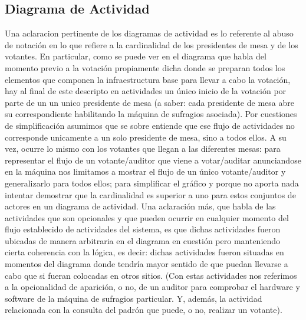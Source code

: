 \documentclass[spanish, 10pt,a4paper]{article}
\numberwithin{equation}{section} %
\begin{document}
\subsection{Diagrama de Actividad}
Una aclaracion pertinente de los diagramas de actividad es lo referente al abuso de notación en lo que refiere a la cardinalidad de los presidentes de mesa y de los votantes. En particular, como se puede ver en el diagrama que habla del momento previo a la votaci\'on propiamente dicha donde se preparan todos los elementos que componen la infraestructura base para llevar a cabo la votaci\'on, hay al final de este descripto en actividades un \'unico inicio de la votaci\'on por parte de un un unico presidente de mesa (a saber: cada presidente de mesa abre su correspondiente habilitando la m\'aquina de sufragios asociada). Por cuestiones de simplificaci\'on asumimos que se sobre entiende que ese flujo de actividades no corresponde unicamente a un solo presidente de mesa, sino a todos ellos.
A su vez, ocurre lo mismo con los votantes que llegan a las diferentes mesas: para representar el flujo de un votante/auditor que viene a votar/auditar anunciandose en la m\'aquina nos limitamos a mostrar el flujo de un \'unico votante/auditor y generalizarlo para todos ellos; para simplificar el gr\'afico y porque no aporta nada intentar demostrar que la cardinalidad es superior a uno para estos conjuntos de actores en un diagrama de actividad. 
Una aclaraci\'on m\'as, que habla de las actividades que son opcionales y que pueden ocurrir en cualquier momento del flujo establecido de actividades del sistema, es que dichas actividades fueron ubicadas de manera arbitraria en el diagrama en cuesti\'on pero manteniendo cierta coherencia con la l\'ogica, es decir: dichas actividades fueron situadas en momentos del diagrama donde tendr\'ia mayor sentido de que puedan llevarse a cabo que si fueran colocadas en otros sitios. (Con estas actividades nos referimos a la opcionalidad de aparici\'on, o no, de un auditor para comprobar el hardware y software de la m\'aquina de sufragios particular. Y, adem\'as, la actividad relacionada con la consulta del padr\'on que puede, o no, realizar un votante).\\
\end{document}

